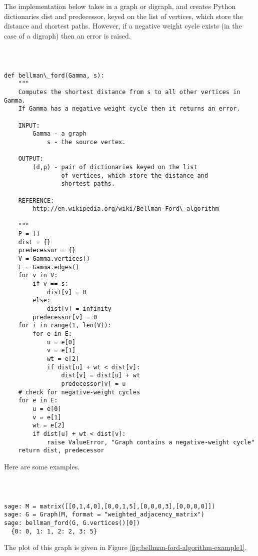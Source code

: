 The implementation below takes in a graph or digraph, and creates Python
dictionaries dist and predecessor, keyed on the list of vertices, 
which store the distance and shortest paths. However, if a 
negative weight cycle exists (in the case of a digraph) then 
an error is raised.

%
\begin{center}
\fontsize{9pt}{9pt}
\selectfont
\tt
\begin{lstlisting}

def bellman\_ford(Gamma, s):
    """
    Computes the shortest distance from s to all other vertices in Gamma.
    If Gamma has a negative weight cycle then it returns an error.

    INPUT:
        Gamma - a graph 
            s - the source vertex.

    OUTPUT:
        (d,p) - pair of dictionaries keyed on the list 
                of vertices, which store the distance and 
                shortest paths.

    REFERENCE:
        http://en.wikipedia.org/wiki/Bellman-Ford\_algorithm

    """
    P = []
    dist = {}
    predecessor = {}
    V = Gamma.vertices()
    E = Gamma.edges()
    for v in V:
        if v == s:
            dist[v] = 0
        else:
            dist[v] = infinity
        predecessor[v] = 0
    for i in range(1, len(V)):       
        for e in E: 
            u = e[0]
            v = e[1]     
            wt = e[2]     
            if dist[u] + wt < dist[v]:
                dist[v] = dist[u] + wt
                predecessor[v] = u
    # check for negative-weight cycles
    for e in E:
        u = e[0]
        v = e[1]     
        wt = e[2]     
        if dist[u] + wt < dist[v]:
            raise ValueError, "Graph contains a negative-weight cycle"
    return dist, predecessor

\end{lstlisting}
\end{center}

Here are some examples.

%
\begin{center}
\fontsize{9pt}{9pt}
\selectfont
\tt
\begin{lstlisting}

sage: M = matrix([[0,1,4,0],[0,0,1,5],[0,0,0,3],[0,0,0,0]])
sage: G = Graph(M, format = "weighted_adjacency_matrix")
sage: bellman_ford(G, G.vertices()[0])
  {0: 0, 1: 1, 2: 2, 3: 5}

\end{lstlisting}
\end{center}
The plot of this graph is given in Figure
\ref{fig:bellman-ford-algorithm-example1}.

